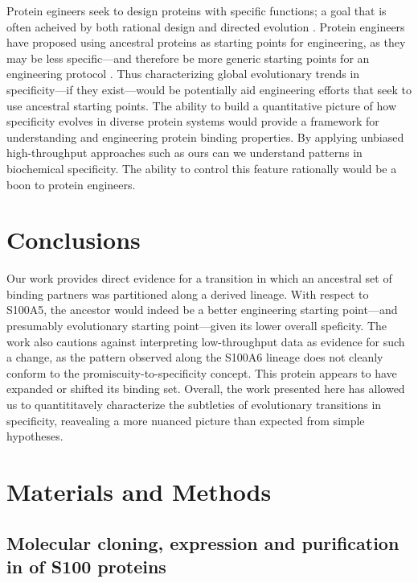 Protein egineers seek to design proteins with specific functions;
a goal that is often acheived by both rational design and directed
evolution \citep{arnold_protein_1993,anand_tailored_2015,schwarz_viruslike_2016,arnold_directed_nodate,hammer_design_2017}.
Protein engineers have proposed using ancestral proteins as starting
points for engineering, as they may be less specific---and therefore
be more generic starting points for an engineering protocol \citep{risso_hyperstability_2013}.
Thus characterizing global evolutionary trends in specificity---if they
exist---would be potentially aid engineering efforts that seek to use
ancestral starting points. The ability to build a quantitative picture
of how specificity evolves in diverse protein systems would provide
a framework for understanding and engineering protein binding properties.
By applying unbiased high-throughput approaches such as ours can we
understand patterns in biochemical specificity. The ability to control
this feature rationally would be a boon to protein engineers. 

\section{Conclusions}
Our work provides direct evidence for a transition in which an ancestral
set of binding partners was partitioned along a derived lineage. With
respect to S100A5, the ancestor would indeed be a better engineering
starting point---and presumably evolutionary starting point---given its
lower overall speficity. The work also cautions against interpreting
low-throughput data as evidence for such a change, as the pattern
observed along the S100A6 lineage does not cleanly conform to the
promiscuity-to-specificity concept. This protein appears to have expanded
or shifted its binding set. Overall, the work presented here has allowed
us to quantititavely characterize the subtleties of evolutionary transitions
in specificity, reavealing a more nuanced picture than expected from
simple hypotheses. 


\section{Materials and Methods}

\subsection{Molecular cloning, expression and purification in of S100 proteins}

